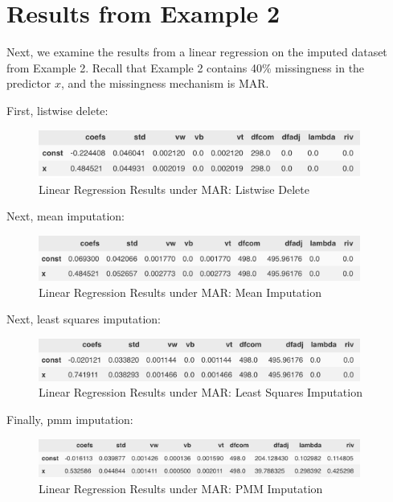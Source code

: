 \documentclass[12pt,oneside]{chicagocapstone}
\begin{document}
\section*{Results from Example 2}\label{results-from-example-2}

Next, we examine the results from a linear regression on the imputed
dataset from Example 2. Recall that Example 2 contains 40\% missingness
in the predictor \(x\), and the missingness mechanism is MAR.

First, listwise delete:
\begin{figure}

{\centering \includegraphics[width=400px]{figure/mar-listwise-delete} 

}

\caption{Linear Regression Results under MAR: Listwise Delete}\label{fig:mar-listwise-delete}
\end{figure}
Next, mean imputation:
\begin{figure}

{\centering \includegraphics[width=400px]{figure/mar-mean} 

}

\caption{Linear Regression Results under MAR: Mean Imputation}\label{fig:mar-mean}
\end{figure}
Next, least squares imputation:
\begin{figure}

{\centering \includegraphics[width=400px]{figure/mar-ls} 

}

\caption{Linear Regression Results under MAR: Least Squares Imputation}\label{fig:mar-ls}
\end{figure}
Finally, pmm imputation:
\begin{figure}

{\centering \includegraphics[width=400px]{figure/mar-pmm} 

}

\caption{Linear Regression Results under MAR: PMM Imputation}\label{fig:mar-pmm}
\end{figure}
\end{document}
